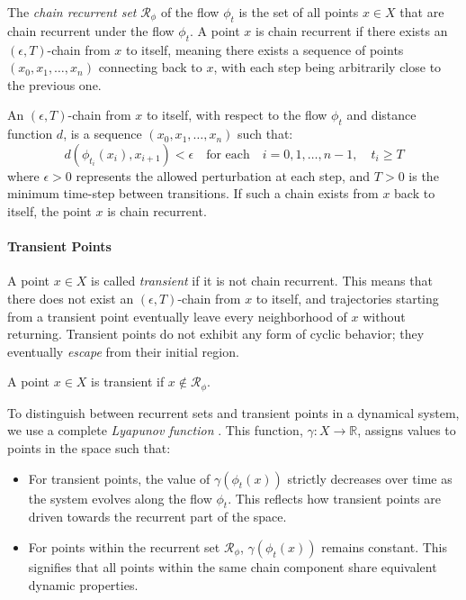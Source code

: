             The \emph{chain recurrent set} $\mathcal{R}_\phi$ of the flow $\phi_t$ is the set of all points $x \in X$ that are chain recurrent under the flow $\phi_t$. A point $x$ is chain recurrent if there exists an $(\epsilon, T)$-chain from $x$ to itself, meaning there exists a sequence of points $(x_0, x_1, \dots, x_n)$ connecting back to $x$, with each step being arbitrarily close to the previous one.

            \begin{definition}
                An $(\epsilon, T)$-chain from $x$ to itself, with respect to the flow $\phi_t$ and distance function $d$, is a sequence $(x_0, x_1, \dots, x_n)$ such that:
                \begin{equation}
                    d(\phi_{t_i}(x_i), x_{i+1}) < \epsilon \quad \text{for each} \quad i = 0, 1, \dots, n-1, \quad t_i \geq T
                    \nonumber
                \end{equation}
                where $\epsilon > 0$ represents the allowed perturbation at each step, and $T > 0$ is the minimum time-step between transitions. If such a chain exists from $x$ back to itself, the point $x$ is chain recurrent.
            \end{definition}

        \paragraph{Transient Points}

            A point $x \in X$ is called \emph{transient} if it is not chain recurrent. This means that there does not exist an $(\epsilon, T)$-chain from $x$ to itself, and trajectories starting from a transient point eventually leave every neighborhood of $x$ without returning. Transient points do not exhibit any form of cyclic behavior; they eventually \emph{escape} from their initial region.
        
            \begin{definition}
                A point $x \in X$ is transient if $x \notin \mathcal{R}_\phi$.\tinydouble
            \end{definition}

        \noindent
        To distinguish between recurrent sets and transient points in a dynamical system, we use a complete \emph{Lyapunov function} \cite{lyapunov1950}. This function, $\gamma: X \to \mathbb{R}$, assigns values to points in the space such that:
        \begin{itemize}
            \item For transient points, the value of $\gamma(\phi_t(x))$ strictly decreases over time as the system evolves along the flow $\phi_t$. This reflects how transient points are driven towards the recurrent part of the space.
            \item For points within the recurrent set $\mathcal{R}_\phi$, $\gamma(\phi_t(x))$ remains constant. This signifies that all points within the same chain component share equivalent dynamic properties.\tinydouble
        \end{itemize}

